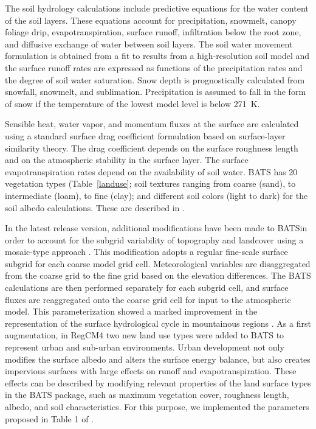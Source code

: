 The soil hydrology calculations include predictive equations for the water
content of the soil layers.  These equations account for precipitation,
snowmelt, canopy foliage drip, evapotranspiration, surface runoff, infiltration
below the root zone, and diffusive exchange of water between soil layers.  The
soil water movement formulation is obtained from a fit to results from a
high-resolution soil model \cite{Dickinson_84} and the surface runoff rates are
expressed as functions of the precipitation rates and the degree of soil water
saturation.  Snow depth is prognostically calculated from snowfall, snowmelt,
and sublimation.  Precipitation is assumed to fall in the form of snow if the
temperature of the lowest model level is below 271~K.

Sensible heat, water vapor, and momentum fluxes at the surface are calculated
using a standard surface drag coefficient formulation based on surface-layer
similarity theory.  The drag coefficient depends on the surface roughness length
and on the atmospheric stability in the surface layer.  The surface
evapotranspiration rates depend on the availability of soil water.  \ac{BATS}
has 20 vegetation types (Table~\ref{landuse};  soil textures ranging from coarse
(sand), to intermediate (loam), to fine (clay);  and different soil colors
(light to dark) for the soil albedo calculations.  These are described in
\cite{Dickinson_86}. 

In the latest release version, additional modifications have been made to
\ac{BATS}in order to account for the subgrid variability of topography and
landcover using a mosaic-type approach \citep{Giorgi03b}.  This modification
adopts a regular fine-scale surface subgrid for each coarse model grid cell.
Meteorological variables are disaggregated from the coarse grid to the fine
grid based on the elevation differences.  The \ac{BATS} calculations are then
performed separately for each subgrid cell, and surface fluxes are reaggregated
onto the coarse grid cell for input to the atmospheric model.
This parameterization showed a marked improvement in the representation of the
surface hydrological cycle in mountainous regions \citep{Giorgi03b}.
As a first augmentation, in \ac{RegCM}4 two new land use types were added to
\ac{BATS} to represent urban and sub-urban environments. Urban development not
only modifies the surface albedo and alters the surface energy balance, but
also creates impervious surfaces with large effects on runoff and
evapotranspiration.
These effects can be described by modifying relevant properties of the land
surface types in the BATS package, such as maximum vegetation cover, roughness
length, albedo, and soil characteristics. For this purpose, we implemented the
parameters proposed in Table 1 of \cite{Kueppers_08}.

